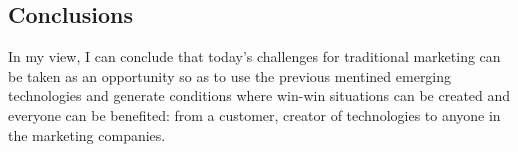 \documentclass[10pt]{article}
\begin{document}
\subsection{Conclusions}
In my view, I can conclude that today's challenges for traditional
 marketing can be taken as an opportunity so as to use 
the previous mentined emerging technologies and generate conditions 
where win-win situations can be created and 
everyone can be benefited: from a customer, creator of technologies 
to anyone in the marketing companies.
\end{document}
